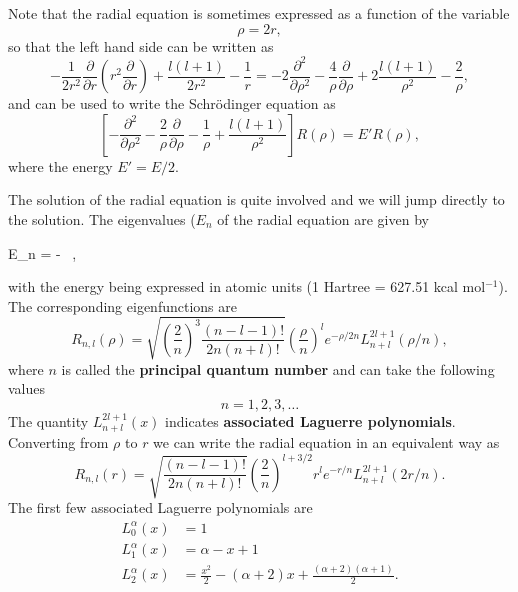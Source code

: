 \documentclass[../Main/chem331-notes.tex]{subfiles}
\begin{document}
Note that the radial equation is sometimes expressed as a function of the variable
\begin{equation}
\rho = 2r,
\end{equation}
so that the left hand side can be written as
\begin{equation}
-\frac{1}{2r^2} \frac{\partial}{\partial r} \left( r^2 \frac{\partial  }{\partial r} \right) + \frac{l(l+1)}{2r^2} - \frac{1}{r}
= -2 \frac{\partial^2}{\partial \rho^2}
-\frac{4}{\rho} \frac{\partial}{\partial \rho} + 2\frac{l(l+1)}{\rho^2} - \frac{2}{\rho},
\end{equation}
and can be used to write the Schr\"{o}dinger equation as
\begin{equation}
\left[
-\frac{\partial^2 }{\partial \rho^2}
-\frac{2}{\rho}\frac{\partial }{\partial \rho}
-\frac{1}{\rho} + \frac{l(l+1)}{\rho^2} \right] R(\rho) = E' R(\rho),
\end{equation}
where the energy $E' = E / 2$.

The solution of the radial equation is quite involved and we will jump directly to the solution. The eigenvalues ($E_n$ of the radial equation are given by
\begin{iequation}
E_n = -   \, ,
\end{iequation}
with the energy being expressed in atomic units (1 Hartree = 627.51 kcal mol$^{-1}$).
The corresponding eigenfunctions are
\begin{equation}
R_{n,l}(\rho) = \sqrt{\left(\frac{2}{n} \right)^{3} \frac{ (n-l-1)! }{ 2n (n+l)!} }\left(\frac{\rho}{n}\right)^l e^{-\rho/2n} L_{n+l}^{2l+1}(\rho/n),
\end{equation}
where $n$ is called the \textbf{principal quantum number} and can take the following values
\begin{equation}
n = 1, 2, 3, \ldots
\end{equation}
The quantity $L_{n+l}^{2l+1}(x)$ indicates \textbf{associated Laguerre polynomials}.
Converting from $\rho$ to $r$ we can write the radial equation in an equivalent way as
\begin{equation}
R_{n,l}(r) = \sqrt{\frac{ (n-l-1)! }{ 2n (n+l)!} } \left(\frac{2}{n} \right)^{l + 3/2} r^l e^{-r/n} L_{n+l}^{2l+1}(2r/n).
\end{equation}
The first few associated Laguerre polynomials are
\begin{equation}
\begin{split}
L_0^\alpha(x) & = 1 \\
L_1^\alpha(x) & = \alpha - x + 1 \\
L_2^\alpha(x) & = \frac{x^2}{2} - (\alpha + 2) x + \frac{(\alpha + 2)(\alpha + 1)}{2}.
\end{split}
\end{equation}
\end{document}
